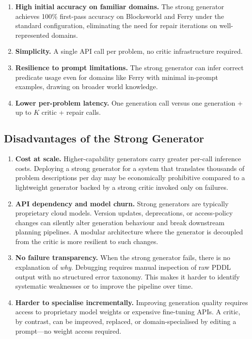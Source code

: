 \documentclass{article}
\begin{document}
\begin{enumerate}[leftmargin=1.5em]
  \item \textbf{High initial accuracy on familiar domains.}
        The strong generator achieves 100\% first-pass accuracy on Blocksworld and
        Ferry under the standard configuration, eliminating the need for repair
        iterations on well-represented domains.

  \item \textbf{Simplicity.}
        A single API call per problem, no critic infrastructure required.

  \item \textbf{Resilience to prompt limitations.}
        The strong generator can infer correct predicate usage even for domains
        like Ferry with minimal in-prompt examples, drawing on broader world knowledge.

  \item \textbf{Lower per-problem latency.}
        One generation call versus one generation + up to $K$ critic + repair calls.
\end{enumerate}

\subsection{Disadvantages of the Strong Generator}
\label{sec:strong_dis}

\begin{enumerate}[leftmargin=1.5em]
  \item \textbf{Cost at scale.}
        Higher-capability generators carry greater per-call inference costs.
        Deploying a strong generator for a system that translates thousands of
        problem descriptions per day may be economically prohibitive compared
        to a lightweight generator backed by a strong critic invoked only on failures.

  \item \textbf{API dependency and model churn.}
        Strong generators are typically proprietary cloud models.  Version updates,
        deprecations, or access-policy changes can silently alter generation behaviour
        and break downstream planning pipelines.  A modular architecture where the
        generator is decoupled from the critic is more resilient to such changes.

  \item \textbf{No failure transparency.}
        When the strong generator fails, there is no explanation of \emph{why}.
        Debugging requires manual inspection of raw PDDL output with no structured
        error taxonomy.  This makes it harder to identify systematic weaknesses
        or to improve the pipeline over time.

  \item \textbf{Harder to specialise incrementally.}
        Improving generation quality requires access to proprietary model weights or
        expensive fine-tuning APIs.  A critic, by contrast, can be improved, replaced,
        or domain-specialised by editing a prompt---no weight access required.
\end{enumerate}
\end{document}
